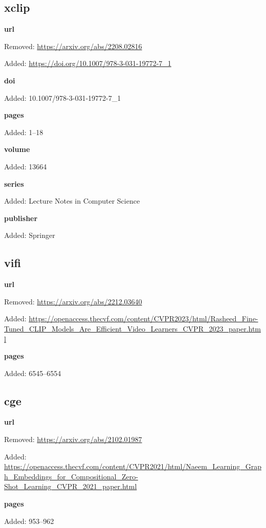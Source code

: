 \subsection*{xclip}
\noindent\textbf{url}\par
{\color{AuditRed}Removed: \url{https://arxiv.org/abs/2208.02816}\par}
{\color{AuditGreen}Added: \url{https://doi.org/10.1007/978-3-031-19772-7_1}\par}
\noindent\textbf{doi}\par
{\color{AuditGreen}Added: 10.1007/978-3-031-19772-7\_1\par}
\noindent\textbf{pages}\par
{\color{AuditGreen}Added: 1–18\par}
\noindent\textbf{volume}\par
{\color{AuditGreen}Added: 13664\par}
\noindent\textbf{series}\par
{\color{AuditGreen}Added: Lecture Notes in Computer Science\par}
\noindent\textbf{publisher}\par
{\color{AuditGreen}Added: Springer\par}
\medskip

\subsection*{vifi}
\noindent\textbf{url}\par
{\color{AuditRed}Removed: \url{https://arxiv.org/abs/2212.03640}\par}
{\color{AuditGreen}Added: \url{https://openaccess.thecvf.com/content/CVPR2023/html/Rasheed_Fine-Tuned_CLIP_Models_Are_Efficient_Video_Learners_CVPR_2023_paper.html}\par}
\noindent\textbf{pages}\par
{\color{AuditGreen}Added: 6545–6554\par}
\medskip

\subsection*{cge}
\noindent\textbf{url}\par
{\color{AuditRed}Removed: \url{https://arxiv.org/abs/2102.01987}\par}
{\color{AuditGreen}Added: \url{https://openaccess.thecvf.com/content/CVPR2021/html/Naeem_Learning_Graph_Embeddings_for_Compositional_Zero-Shot_Learning_CVPR_2021_paper.html}\par}
\noindent\textbf{pages}\par
{\color{AuditGreen}Added: 953–962\par}
\medskip

